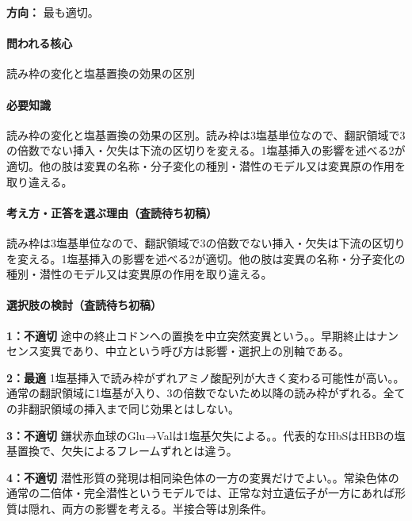 \noindent\textbf{方向：} 最も適切。\par

\paragraph{問われる核心} 読み枠の変化と塩基置換の効果の区別

\paragraph{必要知識} 読み枠の変化と塩基置換の効果の区別。読み枠は3塩基単位なので、翻訳領域で3の倍数でない挿入・欠失は下流の区切りを変える。1塩基挿入の影響を述べる2が適切。他の肢は変異の名称・分子変化の種別・潜性のモデル又は変異原の作用を取り違える。

\paragraph{考え方・正答を選ぶ理由（査読待ち初稿）} 読み枠は3塩基単位なので、翻訳領域で3の倍数でない挿入・欠失は下流の区切りを変える。1塩基挿入の影響を述べる2が適切。他の肢は変異の名称・分子変化の種別・潜性のモデル又は変異原の作用を取り違える。

\paragraph{選択肢の検討（査読待ち初稿）}\mbox{}\par

\noindent\textbf{1：不適切} 途中の終止コドンへの置換を中立突然変異という。。早期終止はナンセンス変異であり、中立という呼び方は影響・選択上の別軸である。\par

\noindent\textbf{2：最適} 1塩基挿入で読み枠がずれアミノ酸配列が大きく変わる可能性が高い。。通常の翻訳領域に1塩基が入り、3の倍数でないため以降の読み枠がずれる。全ての非翻訳領域の挿入まで同じ効果とはしない。\par

\noindent\textbf{3：不適切} 鎌状赤血球のGlu→Valは1塩基欠失による。。代表的なHbSはHBBの塩基置換で、欠失によるフレームずれとは違う。\par

\noindent\textbf{4：不適切} 潜性形質の発現は相同染色体の一方の変異だけでよい。。常染色体の通常の二倍体・完全潜性というモデルでは、正常な対立遺伝子が一方にあれば形質は隠れ、両方の影響を考える。半接合等は別条件。\par

